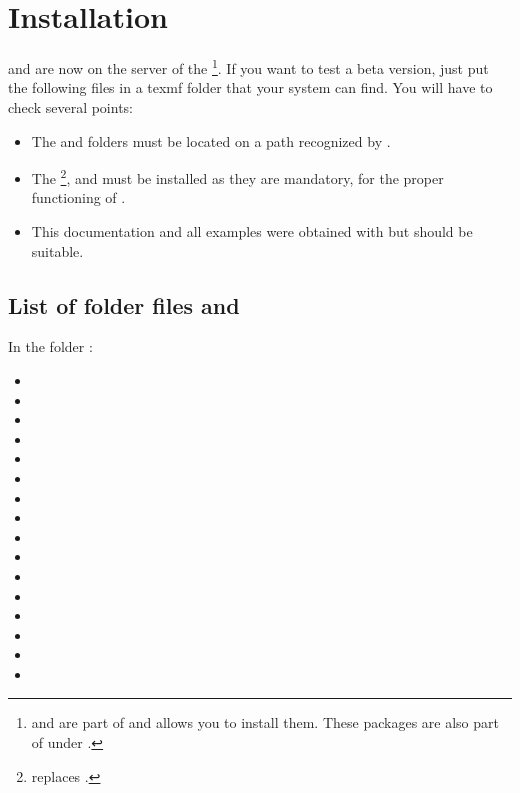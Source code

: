  \section{Installation}

 and  are now on the server of the \footnote{ and  are part of  and  allows you to install them. These packages are also part of  under .}. If you want to test a beta version, just put the following files in a texmf folder that your system can find.
You will have to check several points:

\begin{itemize}\setlength{\itemsep}{5pt}
\item  The  and  folders must be located on a path recognized by .
\item  The \footnote{ replaces .},  and  must be installed as they are mandatory, for the proper functioning of .
\item This documentation and all examples were obtained with  but  should be suitable.
\end{itemize}

\subsection{List of folder files   and }

In the folder :

\begin{itemize}
\item  {}
\item  {}
\item  {}
\item  {}
\item  {}
\item  {}
\item  {}
\item  {}
\item  {}
\item  {}
\item  {}
\item  {}
\item  {}
\item  {}
\item  {}
\item  {}
\end{itemize}

